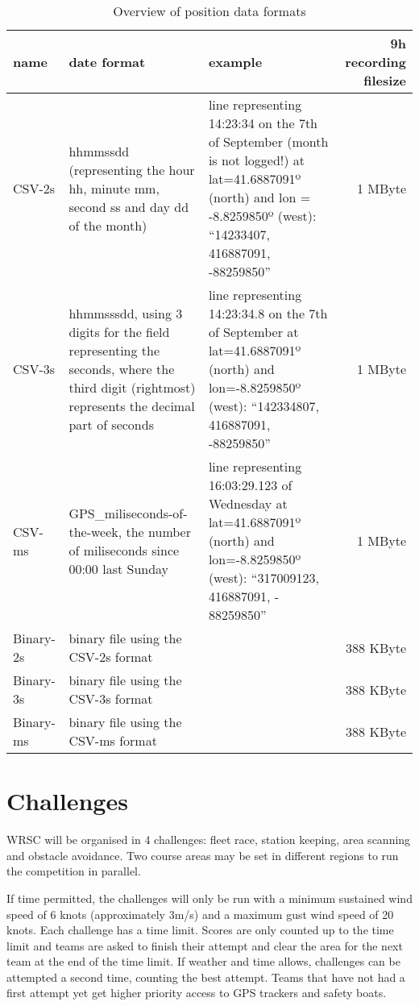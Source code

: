 \documentclass[12pt]{article}
\begin{document}
\begin{landscape}
\centering
\begin{table}
\small{
\begin{tabular}{l|p{6cm}|p{8cm}|r}
name   & date format & example & 9h recording filesize\\
\hline
CSV-2s & hhmmssdd (representing
the hour hh, minute mm, second ss and day dd of the month) &
line representing 14:23:34 on the 7th of September (month is not logged!) at lat=41.6887091º (north) and lon = -8.8259850º (west):
``14233407, 416887091, -88259850'' &
1 MByte\\ \hline

CSV-3s & hhmmsssdd, using 3 digits for the field representing the
seconds, where the third digit (rightmost) represents the decimal part of
seconds & line representing 14:23:34.8 on the 7th of September at
lat=41.6887091º (north) and lon=-8.8259850º (west):
``142334807, 416887091, -88259850''&
1 MByte \\ \hline

CSV-ms & GPS\_miliseconds-of-the-week, the number of miliseconds since 00:00 last Sunday &
line representing 16:03:29.123 of Wednesday at
lat=41.6887091º (north) and lon=-8.8259850º (west):
 “317009123, 416887091, - 88259850”&
1 MByte\\ \hline

Binary-2s &
binary file using the CSV-2s format&
&
388 KByte \\ \hline

Binary-3s &
binary file using the CSV-3s format&
&
388 KByte\\ \hline

Binary-ms &
binary file using the CSV-ms format &
&
388 KByte\\ \hline
\end{tabular}
}
\caption{Overview of position data formats}
\label{tab:dataformats}
\end{table}
\end{landscape}



\section{Challenges}
WRSC will be organised in 4 challenges: fleet race, station keeping, area
scanning and obstacle avoidance.
Two course areas may be set in different regions to run the competition in parallel.

If time permitted, the challenges will only be run with a minimum sustained wind speed of 6 knots
(approximately 3m/s) and a maximum gust wind speed of 20 knots.
Each challenge has a time limit. Scores are only counted up to the time limit 
and teams are asked to finish their attempt and clear the area for the next team 
at the end of the time limit. 
If weather and time allows, challenges can be attempted a
second time, counting the best attempt. Teams that have not had a
first attempt yet get higher priority access to GPS trackers and safety boats.
\end{document}
